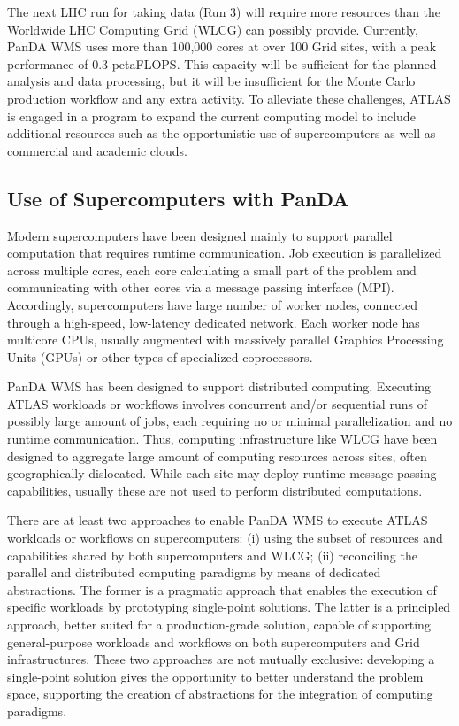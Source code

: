 The next LHC run for taking data (Run 3) will require more resources than the
Worldwide LHC Computing Grid (WLCG) can possibly provide. Currently, PanDA WMS
uses more than 100,000 cores at over 100 Grid sites, with a peak performance of
0.3 petaFLOPS. This capacity will be sufficient for the planned analysis and
data processing, but it will be insufficient for the Monte Carlo production
workflow and any extra activity. To alleviate these challenges, ATLAS is engaged
in a program to expand the current computing model to include additional
resources such as the opportunistic use of supercomputers as well as commercial
and academic clouds.

\subsection{Use of Supercomputers with PanDA}

Modern supercomputers have been designed mainly to support parallel computation
that requires runtime communication. Job execution is parallelized across
multiple cores, each core calculating a small part of the problem and
communicating with other cores via a message passing interface (MPI).
Accordingly, supercomputers have large number of worker nodes, connected through
a high-speed, low-latency dedicated network. Each worker node has multicore
CPUs, usually augmented with massively parallel Graphics Processing Units (GPUs)
or other types of specialized coprocessors.

PanDA WMS has been designed to support distributed computing. Executing ATLAS
workloads or workflows involves concurrent and/or sequential runs of possibly
large amount of jobs, each requiring no or minimal parallelization and no
runtime communication. Thus, computing infrastructure like WLCG have been
designed to aggregate large amount of computing resources across sites, often
geographically dislocated. While each site may deploy runtime message-passing
capabilities, usually these are not used to perform distributed computations.

There are at least two approaches to enable PanDA WMS to execute ATLAS workloads
or workflows on supercomputers: (i) using the subset of resources and
capabilities shared by both supercomputers and WLCG; (ii) reconciling the
parallel and distributed computing paradigms by means of dedicated abstractions.
The former is a pragmatic approach that enables the execution of specific
workloads by prototyping single-point solutions. The latter is a principled
approach, better suited for a production-grade solution, capable of supporting
general-purpose workloads and workflows on both supercomputers and Grid
infrastructures. These two approaches are not mutually exclusive: developing a
single-point solution gives the opportunity to better understand the problem
space, supporting the creation of abstractions for the integration of computing
paradigms.

